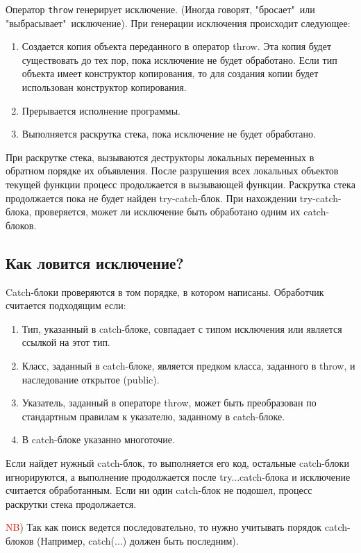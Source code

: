 Оператор \texttt{throw} генерирует исключение. (Иногда говорят, "бросает"\ или "выбрасывает"\ исключение). При генерации исключения происходит следующее:
\begin{enumerate}
    \item
    Создается копия объекта переданного в оператор throw. Эта копия будет существовать до тех пор, пока исключение не будет обработано. Если тип объекта имеет конструктор копирования, то для создания копии будет использован конструктор копирования.
    \item
    Прерывается исполнение программы.
    \item
    Выполняется раскрутка стека, пока исключение не будет обработано.
\end{enumerate}

При раскрутке стека, вызываются деструкторы локальных переменных в обратном порядке их объявления. После разрушения всех локальных объектов текущей функции процесс продолжается в вызывающей функции. Раскрутка стека продолжается пока не будет найден try-catch-блок. При нахождении try-catch-блока, проверяется, может ли исключение быть обработано одним их catch-блоков.

\subsection{Как ловится исключение?}

Catch-блоки проверяются в том порядке, в котором написаны. Обработчик считается подходящим если:
\begin{enumerate}
    \item
    Тип, указанный в catch-блоке, совпадает с типом исключения или является ссылкой на этот тип.
    \item
    Класс, заданный в catch-блоке, является предком класса, заданного в throw, и наследование открытое (public).
    \item
    Указатель, заданный в операторе throw, может быть преобразован по стандартным правилам к указателю, заданному в catch-блоке.
    \item
    В catch-блоке указанно многоточие.
\end{enumerate}

Если найдет нужный catch-блок, то выполняется его код, остальные catch-блоки игнорируются, а выполнение продолжается после try...catch-блока и исключение считается обработанным. Если ни один catch-блок не подошел, процесс раскрутки стека продолжается.

\textcolor{red}{NB}) Так как поиск ведется последовательно, то нужно учитывать порядок catch-блоков (Например, catch(...) должен быть последним).

